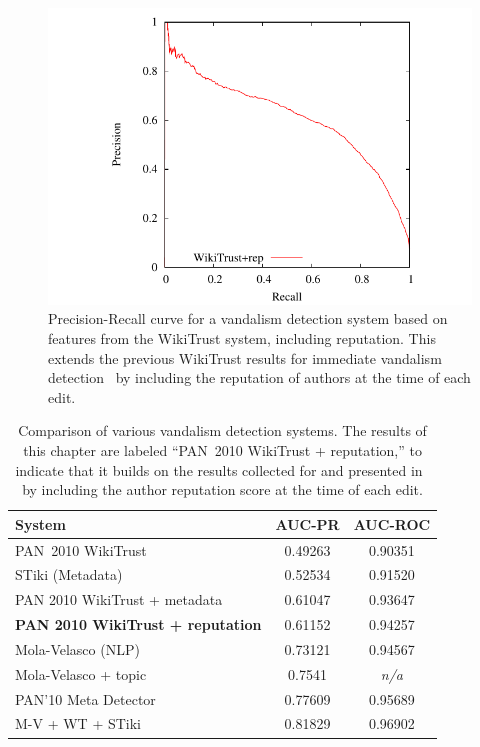 \begin{figure}[tbhp]
  \centering
  \includegraphics{part-Q10-vandalism/graph-wikitrust-pr}
  \caption[Precision-Recall curve for vandalism detection]{%
    Precision-Recall curve for a vandalism detection system based
    on features from the WikiTrust system, including reputation.
    This extends the previous WikiTrust results for immediate vandalism
    detection~\cite{Adler2010b} by including the reputation of authors
    at the time of each edit.}
  \label{fig:vandalrep-prcurve}
\end{figure}

\begin{table}[tbhp]
  \begin{center}
    \begin{tabular}{|l|c|c|}
      \hline
      \textbf{System} & \textbf{AUC-PR} & \textbf{AUC-ROC} \\
      \hline
      \hline
      PAN~2010 WikiTrust~\cite{Potthast2010b} & 0.49263 & 0.90351 \\
      STiki (Metadata)~\cite{Adler2011a} & 0.52534 & 0.91520 \\
      PAN 2010 WikiTrust + metadata~\cite{Adler2011a} & 0.61047 & 0.93647 \\
      \textbf{PAN 2010 WikiTrust + reputation} & 0.61152 & 0.94257 \\
      Mola-Velasco (NLP)~\cite{Adler2011a} & 0.73121 & 0.94567 \\
      Mola-Velasco + topic~\cite{Mola2011} & 0.7541 & \textit{n/a} \\
      PAN'10 Meta Detector~\cite{Potthast2010b} & 0.77609 & 0.95689 \\
      M-V + WT + STiki~\cite{Adler2011a} & 0.81829 & 0.96902 \\
      \hline
    \end{tabular}
  \end{center}
  \caption[Comparison of vandalism detection systems]{%
    Comparison of various vandalism detection systems.
    The results of this chapter are labeled ``PAN~2010 WikiTrust +
    reputation,'' to indicate that it builds on the results collected
    for and presented in~\cite{Potthast2010b} by including the
    author reputation score at the time of each edit.}
  \label{tab:vandalrep-context}
\end{table}

